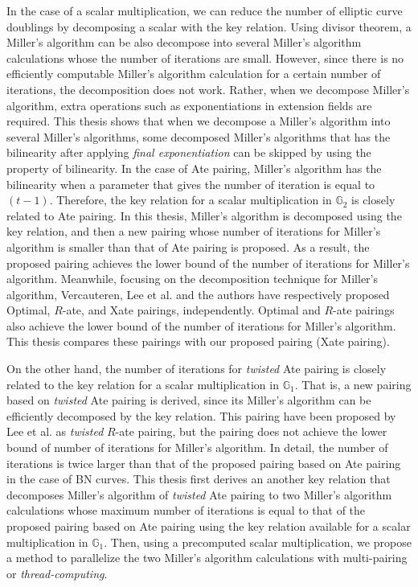 In the case of a scalar multiplication, we can reduce the number of elliptic curve doublings by decomposing a scalar with the key relation.
Using divisor theorem, a Miller's algorithm can be also decompose into several Miller's algorithm calculations whose the number of iterations are small.
However, since there is no efficiently computable Miller's algorithm calculation for a certain number of iterations, the decomposition does not work.  
Rather, when we decompose Miller's algorithm, extra operations such as exponentiations in extension fields are required.
This thesis shows that when we decompose a Miller's algorithm into several Miller's algorithms, some decomposed Miller's algorithms that has the bilinearity after applying {\it final exponentiation} can be skipped by using the property of bilinearity.
In the case of Ate pairing, Miller's algorithm has the bilinearity when a parameter that gives the number of iteration is equal to $(t-1)$.
Therefore, the key relation for a scalar multiplication in $\mathbb{G}_2$ is closely related to Ate pairing.
In this thesis, Miller's algorithm is decomposed using the key relation, and then a new pairing whose number of iterations for Miller's algorithm is smaller than that of Ate pairing is proposed.
As a result, the proposed pairing achieves the lower bound of the number of iterations for Miller's algorithm.
Meanwhile, focusing on the decomposition technique for Miller's algorithm, Vercauteren, Lee et al. and the authors have respectively proposed Optimal, $R$-ate, and Xate pairings, independently.
Optimal and $R$-ate pairings also achieve the lower bound of the number of iterations for Miller's algorithm.
This thesis compares these pairings with our proposed pairing (Xate pairing).

On the other hand, the number of iterations for {\it twisted} Ate pairing is closely related to the key relation for a scalar multiplication in $\mathbb{G}_1$.
That is, a new pairing based on {\it twisted} Ate pairing is derived, since its Miller's algorithm can be efficiently decomposed by the key relation. 
This pairing have been proposed by Lee et al. as {\it twisted} $R$-ate pairing, but the pairing does not achieve the lower bound of number of iterations for Miller's algorithm.
In detail, the number of iterations is twice larger than that of the proposed pairing based on Ate pairing in the case of BN curves.
This thesis first derives an another key relation that decomposes Miller's algorithm of {\it twisted} Ate pairing to two Miller's algorithm calculations whose maximum number of iterations is equal to that of the proposed pairing based on Ate pairing using the key relation available for a scalar multiplication in $\mathbb{G}_1$.
Then, using a precomputed scalar multiplication, we propose a method to parallelize the two Miller's algorithm calculations with multi-pairing or {\it thread-computing}. 

